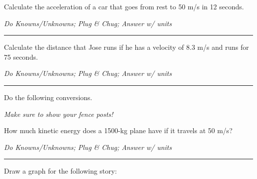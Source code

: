 \documentclass[12pt]{exam}
\begin{document}
\Large

\def\mystrut{\protect\rule[-2.2ex]{0ex}{2.2ex}} 
\qformat{ \textbf{Task \#\thequestion}
  \mystrut  \hfill}


\begin{questions}



\question
  Calculate the acceleration of a car that goes from rest to 50 m/s in 12 seconds. 

  \emph{Do Knowns/Unknowns; Plug \& Chug; Answer w/ units}
  
  \vs \hrule \vs

\question
  Calculate the distance that Jose runs if he has a velocity of 8.3 m/s and runs for 75 seconds. 
  
  \emph{Do Knowns/Unknowns; Plug \& Chug; Answer w/ units}

  
  \vs \hrule \vs

\question 
  Do the following conversions.  
  
  \emph{Make sure to show your fence posts!}

  \vs 


\pagebreak {}


\question
  How much kinetic energy does a 1500-kg plane have if it travels at 50 m/s? 
  
  \emph{Do Knowns/Unknowns; Plug \& Chug; Answer w/ units}


  \vs \hrule \vs




\question
  Draw a graph for the following story: 

\end{questions}
\end{document}
